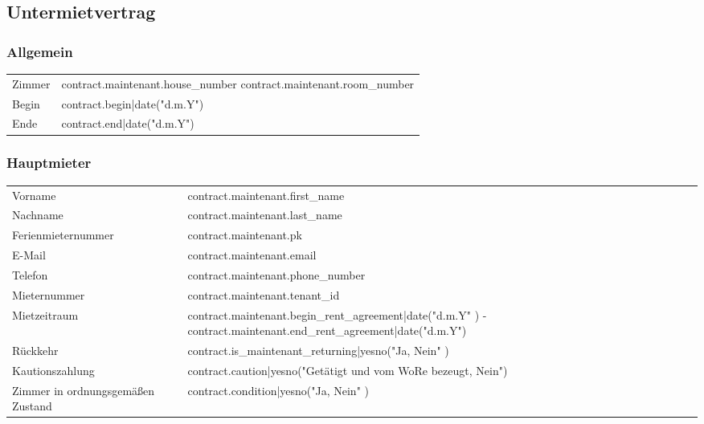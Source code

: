 \documentclass[9pt,pdftex,a4paper]{article}
\begin{document}
%
%

\subsection*{Untermietvertrag}

\subsubsection*{Allgemein}

\begin{tabularx}{\textwidth}{XX}
Zimmer & {{ contract.maintenant.house_number }} {{ contract.maintenant.room_number}}\\
Begin & {{ contract.begin|date("d.m.Y") }}\\
Ende & {{ contract.end|date("d.m.Y") }}\\
\end{tabularx}

\subsubsection*{Hauptmieter}

\begin{tabularx}{\textwidth}{XX}
Vorname & {{ contract.maintenant.first_name }}\\
Nachname & {{ contract.maintenant.last_name }}\\
Ferienmieternummer & {{ contract.maintenant.pk }}\\
E-Mail & {{ contract.maintenant.email }}\\
Telefon & {{ contract.maintenant.phone_number }}\\
Mieternummer & {{ contract.maintenant.tenant_id }}\\
Mietzeitraum& {{ contract.maintenant.begin_rent_agreement|date("d.m.Y" )}} - {{ contract.maintenant.end_rent_agreement|date("d.m.Y") }}\\
Rückkehr&  {{ contract.is_maintenant_returning|yesno("Ja, Nein" )}}\\
Kautionszahlung&  {{ contract.caution|yesno("Getätigt und vom WoRe bezeugt, Nein") }}\\
Zimmer in ordnungsgemäßen Zustand & {{ contract.condition|yesno("Ja, Nein" )}}\\
\end{tabularx}
\end{document}
